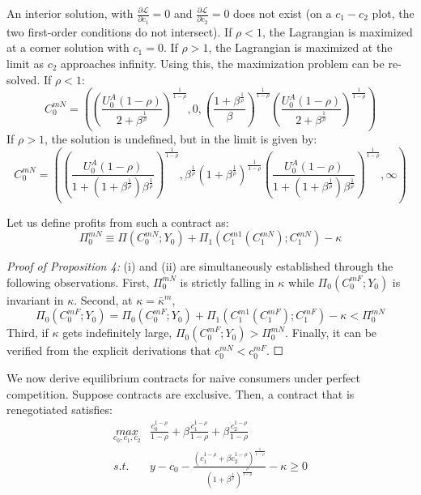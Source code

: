 \documentclass[11pt,english]{article}
\theoremstyle{plain}
\theoremstyle{definition}
\begin{document}
An interior solution, with $\frac{\partial\mathcal{L}}{\partial c_{1}}=0$
and $\frac{\partial\mathcal{L}}{\partial c_{2}}=0$ does not exist
(on a $c_{1}-c_{2}$ plot, the two first-order conditions do not intersect).
If $\rho<1$, the Lagrangian is maximized at a corner solution with
$c_{1}=0$. If $\rho>1$, the Lagrangian is maximized at the limit
as $c_{2}$ approaches infinity. Using this, the maximization problem
can be re-solved. If $\rho<1$: 
\begin{equation}
C_{0}^{mN}=\left(\left(\frac{U_{0}^{A}\left(1-\rho\right)}{2+\beta^{\frac{1}{\rho}}}\right)^{\frac{1}{1-\rho}},0,\left(\frac{1+\beta^{\frac{1}{\rho}}}{\beta}\right)^{\frac{1}{1-\rho}}\left(\frac{U_{0}^{A}\left(1-\rho\right)}{2+\beta^{\frac{1}{\rho}}}\right)^{\frac{1}{1-\rho}}\right)\label{eq:naive-monopolist-contract1}
\end{equation}
If $\rho>1$, the solution is undefined, but in the limit is given
by: 
\begin{equation}
C_{0}^{mN}=\left(\left(\frac{U_{0}^{A}\left(1-\rho\right)}{1+\left(1+\beta^{\frac{1}{\rho}}\right)\beta^{\frac{1}{\rho}}}\right)^{\frac{1}{1-\rho}},\beta^{\frac{1}{\rho}}\left(1+\beta^{\frac{1}{\rho}}\right)^{\frac{1}{1-\rho}}\left(\frac{U_{0}^{A}\left(1-\rho\right)}{1+\left(1+\beta^{\frac{1}{\rho}}\right)\beta^{\frac{1}{\rho}}}\right)^{\frac{1}{1-\rho}},\infty\right)\label{eq:naive-monopolist-contract2}
\end{equation}

Let us define profits from such a contract as: 
\[
\Pi_{0}^{mN}\equiv\Pi\left(C_{0}^{mN};Y_{0}\right)+\Pi_{1}\left(C_{1}^{m1}\left(C_{1}^{mN}\right);C_{1}^{mN}\right)-\kappa
\]

\emph{Proof of Proposition 4:} (i) and (ii) are simultaneously established
through the following observations. First, $\Pi_{0}^{mN}$ is strictly
falling in $\kappa$ while $\Pi_{0}\left(C_{0}^{mF};Y_{0}\right)$
is invariant in $\kappa$. Second, at $\kappa=\bar{\kappa}^{m}$,
\begin{equation}
\Pi_{0}\left(C_{0}^{mF};Y_{0}\right)=\Pi_{0}\left(C_{0}^{mF};Y_{0}\right)+\Pi_{1}\left(C_{1}^{m1}\left(C_{1}^{mF}\right);C_{1}^{mF}\right)-\kappa<\Pi_{0}^{mN}
\end{equation}
Third, if $\kappa$ gets indefinitely large, $\Pi_{0}\left(C_{0}^{mF};Y_{0}\right)>\Pi_{0}^{mN}$.
Finally, it can be verified from the explicit derivations that $c_{0}^{mN}<c_{0}^{mF}$.
$\Square$

We now derive equilibrium contracts for naive consumers under perfect
competition. Suppose contracts are exclusive. Then, a contract that
is renegotiated satisfies: 
\begin{align}
\underset{c_{0},c_{1},c_{2}}{max} & \frac{c_{0}^{1-\rho}}{1-\rho}+\beta\frac{c_{1}^{1-\rho}}{1-\rho}+\beta\frac{c_{2}^{1-\rho}}{1-\rho}\\
s.t. & y-c_{0}-\frac{\left(c_{1}^{1-\rho}+\beta c_{2}^{1-\rho}\right)^{\frac{1}{1-\rho}}}{\left(1+\beta^{\frac{1}{\rho}}\right)^{\frac{\rho}{1-\rho}}}-\kappa\geq0
\end{align}
\end{document}
